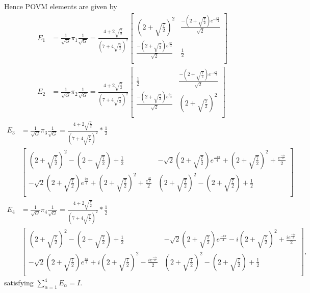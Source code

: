 Hence POVM elements are given by
\begin{align*}
E_{1} & = \frac{1}{\sqrt{G}}\pi_{1}\frac{1}{\sqrt{G}} = \frac{4+2\sqrt{\frac{7}{2}}}{\left(7+4\sqrt{\frac{7}{2}}\right)^2}
\begin{bmatrix}
\left(2+\sqrt{\frac{7}{2}}\right)^2 & \frac{-\left(2+\sqrt{\frac{7}{2}}\right)e^{-i\frac{\pi}{4}}}{\sqrt{2}}  \\ 
\frac{-\left(2+\sqrt{\frac{7}{2}}\right)e^{i\frac{\pi}{4}}}{\sqrt{2}} & \frac{1}{2}\\ 
\end{bmatrix}\\
E_{2} & = \frac{1}{\sqrt{G}}\pi_{2}\frac{1}{\sqrt{G}} = \frac{4+2\sqrt{\frac{7}{2}}}{\left(7+4\sqrt{\frac{7}{2}}\right)^2}
\begin{bmatrix}
\frac{1}{2} & \frac{-\left(2+\sqrt{\frac{7}{2}}\right)e^{-i\frac{\pi}{4}}}{\sqrt{2}}\\ 
\frac{-\left(2+\sqrt{\frac{7}{2}}\right)e^{i\frac{\pi}{4}}}{\sqrt{2}} & \left(2+\sqrt{\frac{7}{2}}\right)^2\\ 
\end{bmatrix}
\end{align*}
{\fontsize{7.9pt}{10pt}\selectfont
\begin{align*}
E_{3} & = \frac{1}{\sqrt{G}}\pi_{3}\frac{1}{\sqrt{G}} = \frac{4+2\sqrt{\frac{7}{2}}}{\left(7+4\sqrt{\frac{7}{2}}\right)^2}*\frac{1}{2}\\
&\begin{bmatrix}
\left(2+\sqrt{\frac{7}{2}}\right)^2-\left(2+\sqrt{\frac{7}{2}}\right)+\frac{1}{2} & -\sqrt{2}\left(2+\sqrt{\frac{7}{2}}\right)e^{\frac{-i\pi}{4}}+\left(2+\sqrt{\frac{7}{2}}\right)^2+\frac{e^{\frac{-i\pi}{2}}}{2} \\
-\sqrt{2}\left(2+\sqrt{\frac{7}{2}}\right)e^{\frac{i\pi}{4}}+\left(2+\sqrt{\frac{7}{2}}\right)^{2}+\frac{e^{\frac{i\pi}{2}}}{2} & \left(2+\sqrt{\frac{7}{2}}\right)^2-\left(2+\sqrt{\frac{7}{2}}\right)+\frac{1}{2}\\
\end{bmatrix}\\
E_{4} & = \frac{1}{\sqrt{G}}\pi_{4}\frac{1}{\sqrt{G}} = \frac{4+2\sqrt{\frac{7}{2}}}{\left(7+4\sqrt{\frac{7}{2}}\right)^2}*\frac{1}{2}\\
&\begin{bmatrix}
\left(2+\sqrt{\frac{7}{2}}\right)^2-\left(2+\sqrt{\frac{7}{2}}\right)+\frac{1}{2} & -\sqrt{2}\left(2+\sqrt{\frac{7}{2}}\right)e^{\frac{-i\pi}{4}}-i\left(2+\sqrt{\frac{7}{2}}\right)^2+\frac{ie^{\frac{-i\pi}{2}}}{2} \\ 
-\sqrt{2}\left(2+\sqrt{\frac{7}{2}}\right)e^{\frac{i\pi}{4}}+i\left(2+\sqrt{\frac{7}{2}}\right)^2-\frac{ie^{\frac{-i\pi}{2}}}{2} & \left(2+\sqrt{\frac{7}{2}}\right)^2-\left(2+\sqrt{\frac{7}{2}}\right)+\frac{1}{2}\\
\end{bmatrix},
\end{align*}}\relax
\newpage
satisfying $\sum_{\alpha=1}^{4} E_{\alpha}= I$.

